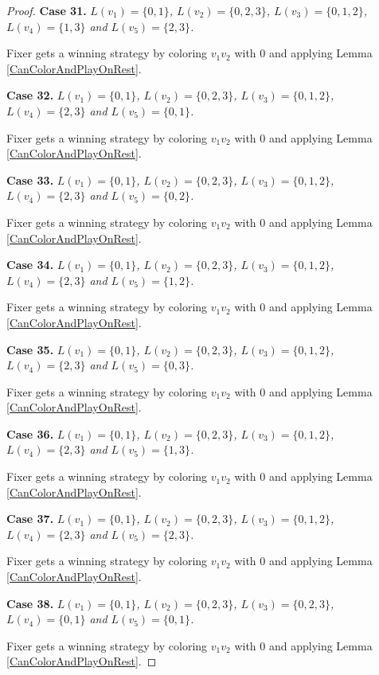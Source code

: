 \documentclass[12pt]{amsart}
\theoremstyle{plain}
\theoremstyle{definition}
\theoremstyle{remark}
\begin{document}
\begin{proof}
\noindent\textbf{Case 31.  }\textit{$L(v_1) = \{0, 1\}$, $L(v_2) = \{0, 2, 3\}$, $L(v_3) = \{0, 1, 2\}$, $L(v_4) = \{1, 3\}$ and $L(v_5) = \{2, 3\}$.}

Fixer gets a winning strategy by coloring $v_1v_2$ with $0$ and applying Lemma \ref{CanColorAndPlayOnRest}.

\noindent\textbf{Case 32.  }\textit{$L(v_1) = \{0, 1\}$, $L(v_2) = \{0, 2, 3\}$, $L(v_3) = \{0, 1, 2\}$, $L(v_4) = \{2, 3\}$ and $L(v_5) = \{0, 1\}$.}

Fixer gets a winning strategy by coloring $v_1v_2$ with $0$ and applying Lemma \ref{CanColorAndPlayOnRest}.

\noindent\textbf{Case 33.  }\textit{$L(v_1) = \{0, 1\}$, $L(v_2) = \{0, 2, 3\}$, $L(v_3) = \{0, 1, 2\}$, $L(v_4) = \{2, 3\}$ and $L(v_5) = \{0, 2\}$.}

Fixer gets a winning strategy by coloring $v_1v_2$ with $0$ and applying Lemma \ref{CanColorAndPlayOnRest}.

\noindent\textbf{Case 34.  }\textit{$L(v_1) = \{0, 1\}$, $L(v_2) = \{0, 2, 3\}$, $L(v_3) = \{0, 1, 2\}$, $L(v_4) = \{2, 3\}$ and $L(v_5) = \{1, 2\}$.}

Fixer gets a winning strategy by coloring $v_1v_2$ with $0$ and applying Lemma \ref{CanColorAndPlayOnRest}.

\noindent\textbf{Case 35.  }\textit{$L(v_1) = \{0, 1\}$, $L(v_2) = \{0, 2, 3\}$, $L(v_3) = \{0, 1, 2\}$, $L(v_4) = \{2, 3\}$ and $L(v_5) = \{0, 3\}$.}

Fixer gets a winning strategy by coloring $v_1v_2$ with $0$ and applying Lemma \ref{CanColorAndPlayOnRest}.

\noindent\textbf{Case 36.  }\textit{$L(v_1) = \{0, 1\}$, $L(v_2) = \{0, 2, 3\}$, $L(v_3) = \{0, 1, 2\}$, $L(v_4) = \{2, 3\}$ and $L(v_5) = \{1, 3\}$.}

Fixer gets a winning strategy by coloring $v_1v_2$ with $0$ and applying Lemma \ref{CanColorAndPlayOnRest}.

\noindent\textbf{Case 37.  }\textit{$L(v_1) = \{0, 1\}$, $L(v_2) = \{0, 2, 3\}$, $L(v_3) = \{0, 1, 2\}$, $L(v_4) = \{2, 3\}$ and $L(v_5) = \{2, 3\}$.}

Fixer gets a winning strategy by coloring $v_1v_2$ with $0$ and applying Lemma \ref{CanColorAndPlayOnRest}.

\noindent\textbf{Case 38.  }\textit{$L(v_1) = \{0, 1\}$, $L(v_2) = \{0, 2, 3\}$, $L(v_3) = \{0, 2, 3\}$, $L(v_4) = \{0, 1\}$ and $L(v_5) = \{0, 1\}$.}

Fixer gets a winning strategy by coloring $v_1v_2$ with $0$ and applying Lemma \ref{CanColorAndPlayOnRest}.


\end{proof}
\end{document}
